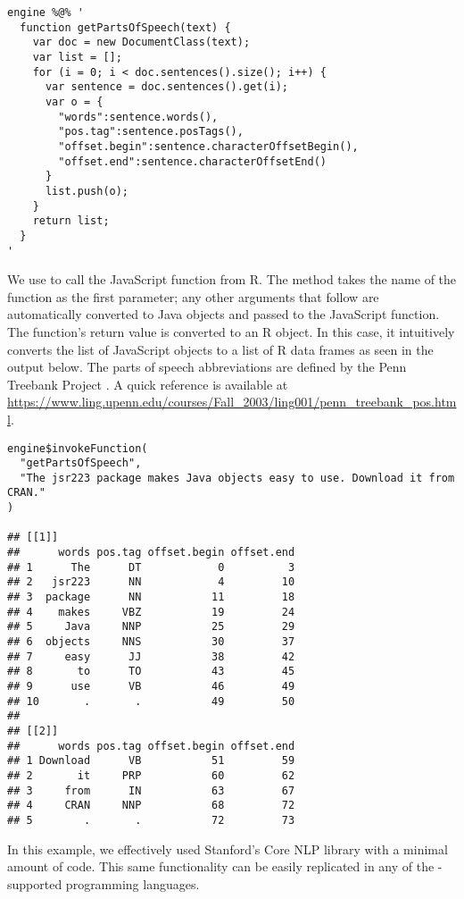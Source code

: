 \begin{verbatim}
engine %@% '
  function getPartsOfSpeech(text) {
    var doc = new DocumentClass(text);
    var list = [];
    for (i = 0; i < doc.sentences().size(); i++) {
      var sentence = doc.sentences().get(i);
      var o = {
        "words":sentence.words(),
        "pos.tag":sentence.posTags(),
        "offset.begin":sentence.characterOffsetBegin(),
        "offset.end":sentence.characterOffsetEnd()
      }
      list.push(o);
    }
    return list;
  }
'
\end{verbatim}
We use  to call the JavaScript function  from R. The method  takes the name of the function as the first parameter; any other arguments that follow are automatically converted to Java objects and passed to the JavaScript function. The function's return value is converted to an R object. In this case, it intuitively converts the list of JavaScript objects to a list of R data frames as seen in the output below. The parts of speech abbreviations are defined by the Penn Treebank Project \citep{penntreebankproject}. A quick reference is available at \url{https://www.ling.upenn.edu/courses/Fall_2003/ling001/penn_treebank_pos.html}.

\begin{verbatim}
engine$invokeFunction(
  "getPartsOfSpeech",
  "The jsr223 package makes Java objects easy to use. Download it from CRAN."
)

## [[1]]
##      words pos.tag offset.begin offset.end
## 1      The      DT            0          3
## 2   jsr223      NN            4         10
## 3  package      NN           11         18
## 4    makes     VBZ           19         24
## 5     Java     NNP           25         29
## 6  objects     NNS           30         37
## 7     easy      JJ           38         42
## 8       to      TO           43         45
## 9      use      VB           46         49
## 10       .       .           49         50
##
## [[2]]
##      words pos.tag offset.begin offset.end
## 1 Download      VB           51         59
## 2       it     PRP           60         62
## 3     from      IN           63         67
## 4     CRAN     NNP           68         72
## 5        .       .           72         73
\end{verbatim}

In this example, we effectively used Stanford's Core NLP library with a minimal amount of code. This same functionality can be easily replicated in any of the -supported programming languages.

